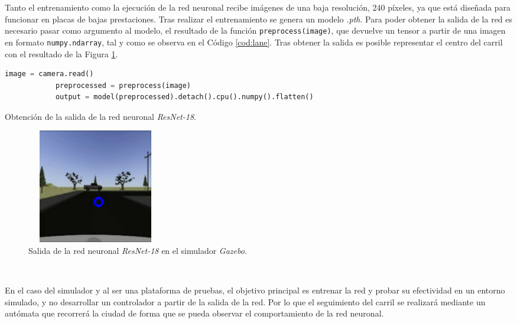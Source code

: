 Tanto el entrenamiento como la ejecución de la red neuronal recibe imágenes de una baja resolución, 240 píxeles, ya que está diseñada para funcionar en placas de bajas prestaciones. Tras realizar el entrenamiento se genera un modelo \textit{.pth}. Para poder obtener la salida de la red es necesario pasar como argumento al modelo, el resultado de la función \verb|preprocess(image)|, que devuelve un tensor a partir de una imagen en formato \verb|numpy.ndarray|, tal y como se observa en el Código \ref{cod:lane}. Tras obtener la salida es posible representar el centro del carril con el resultado de la Figura \ref{fig:outputnnsim}.\\

\begin{code}[h]
	\begin{lstlisting}[language=Python]
			image = camera.read()
    		preprocessed = preprocess(image)
    		output = model(preprocessed).detach().cpu().numpy().flatten()
	\end{lstlisting}
	\caption[Obtención de la salida de la red neuronal \textit{ResNet-18}.]{Obtención de la salida de la red neuronal \textit{ResNet-18}.}
	\label{cod:lane}
\end{code}

\begin{figure} [h!]
	\begin{center}
		\includegraphics[width=6cm, height=5cm]{figs/outputNNsim}
	\end{center}
	\caption{Salida de la red neuronal \textit{ResNet-18} en el simulador \textit{Gazebo}.}
	\label{fig:outputnnsim}
\end{figure}\

En el caso del simulador y al ser una plataforma de pruebas, el objetivo principal es entrenar la red y probar su efectividad en un entorno simulado, y no desarrollar un controlador a partir de la salida de la red. Por lo que el seguimiento del carril se realizará mediante un autómata que recorrerá la ciudad de forma que se pueda observar el comportamiento de la red neuronal.\\

